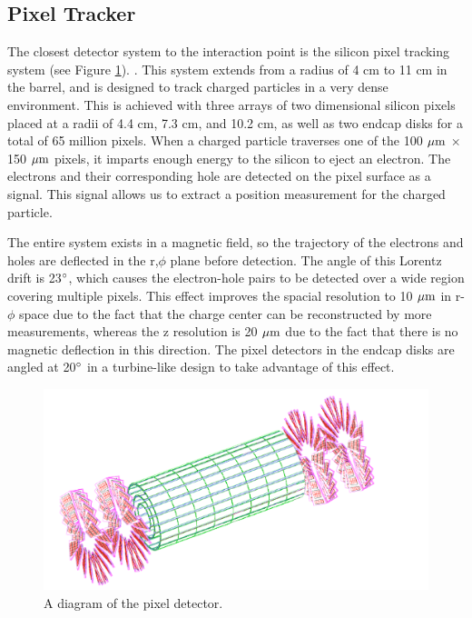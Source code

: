 \subsection{Pixel Tracker}
The closest detector system to the interaction point is the silicon pixel tracking system (see Figure \ref{figs:CMSpixel}).   .  
This system extends from a radius of 4 cm to 11 cm in the barrel, and is designed to track charged particles in a very dense environment.  
This is achieved with three arrays of two dimensional silicon pixels placed at a radii of 4.4 cm, 7.3 cm, and 10.2 cm, as well as two endcap disks for a total of 65 million pixels.  
When a charged particle traverses one of the 100 $\mathrm{\mu m}$ $\times$ 150 $\mathrm{\mu m}$ pixels, it imparts enough energy to the silicon to eject an electron.  
The electrons and their corresponding hole are detected on the pixel surface as a signal.  
This signal allows us to extract a position measurement for the charged particle.  

The entire system exists in a magnetic field, so the trajectory of the electrons and holes are deflected in the r,$\phi$ plane before detection.  
The angle of this Lorentz drift is 23$\mathrm{^{\circ}}$, which causes the electron-hole pairs to be detected over a wide region covering multiple pixels.  
This effect improves the spacial resolution to 10 $\mathrm{\mu m}$ in r-$\phi$ space due to the fact that the charge center can be reconstructed by more measurements, 
whereas the z resolution is 20 $\mathrm{\mu m}$ due to the fact that there is no magnetic deflection in this direction. 
The pixel detectors in the endcap disks are angled at 20$\mathrm{^{\circ}}$ in a turbine-like design to take advantage of this effect.  

  

\begin{figure}
\begin{center}
\includegraphics[width=1.0\linewidth]{figs/CMSpixel.png}
\caption{A diagram of the pixel detector.}
\label{figs:CMSpixel}
\end{center}
\end{figure}
  
